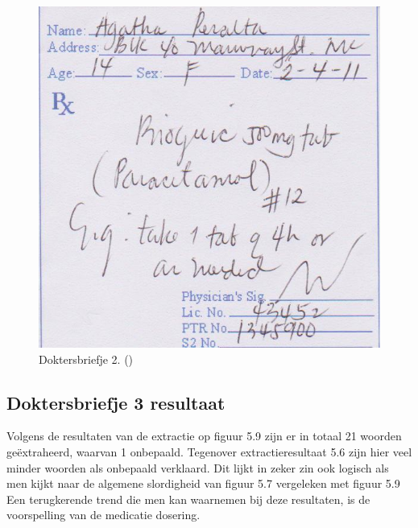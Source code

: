 \begin{figure}
	
	\includegraphics[width=\textwidth,height=\textheight,keepaspectratio]{../doktersbriefjes/dokterbriefje_2.jpg}
	\captionsetup{justification=centering,margin=2cm}
	\caption{Doktersbriefje 2. (\cite{Tacio2013})}
	\centering
\end{figure}
\clearpage

\subsection{Doktersbriefje 3 resultaat}
Volgens de resultaten van de extractie op figuur 5.9 zijn er in totaal 21 woorden geëxtraheerd, waarvan 1 onbepaald. Tegenover extractieresultaat 5.6 zijn hier veel minder woorden als onbepaald verklaard. Dit lijkt in zeker zin ook logisch als men kijkt naar de algemene slordigheid van figuur 5.7 vergeleken met figuur 5.9 Een terugkerende trend die men kan waarnemen bij deze resultaten, is de voorspelling van de medicatie dosering.  

